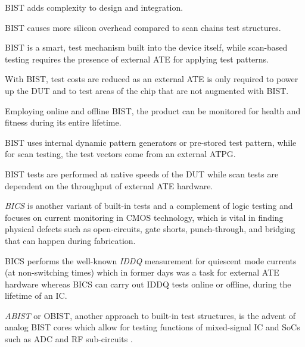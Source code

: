 \begin{itemize}[topsep=8pt,itemsep=4pt,partopsep=4pt, parsep=4pt]

    \itemcon \ac{BIST} adds complexity to design and integration.

    \itemcon \ac{BIST}  causes more silicon overhead compared to
    scan chains test structures.

    \itempro \ac{BIST} is a smart, test mechanism built into the
    device itself, while scan-based testing requires the presence of external
    \ac{ATE} for applying test patterns.

    \itempro With \ac{BIST}, test costs are reduced as an external
    \ac{ATE} is only required to power up the \acs{DUT}
    and to test areas of the chip that are not augmented with
    \ac{BIST}.

    \itempro Employing online and offline \ac{BIST}, the product can be
    monitored for health and fitness during its entire lifetime.

    \itempro \ac{BIST} uses internal dynamic pattern generators or
    pre-stored test pattern, while for scan testing, the test vectors
    come from an external \ac{ATPG}.

    \itempro \ac{BIST} tests are performed at native speeds of the \ac{DUT}
    while scan tests are dependent on the throughput of external \ac{ATE}
    hardware.

\end{itemize}

\emph{\ac{BICS}} is another variant of built-in tests and a complement of logic testing
and focuses on current monitoring in \ac{CMOS} technology, which is vital in
finding physical defects such as open-circuits, gate shorts, punch-through,
and bridging that can happen during fabrication.

\ac{BICS} performs the well-known \emph{IDDQ} measurement for quiescent mode
currents (at non-switching times) which in former days was a task
for external \ac{ATE} hardware \autocite{Nicolaidis} whereas \ac{BICS} can
carry out IDDQ tests online or offline, during the lifetime of an \ac{IC}.

\emph{\ac{ABIST}} or \ac{OBIST}, another approach to built-in test structures,
is the advent of analog \ac{BIST} cores \autocite{1604093} which allow for
testing functions of mixed-signal \ac{IC} and \acp{SoC} such as \ac{ADC} and
\ac{RF} sub-circuits \autocite{4437457}.
